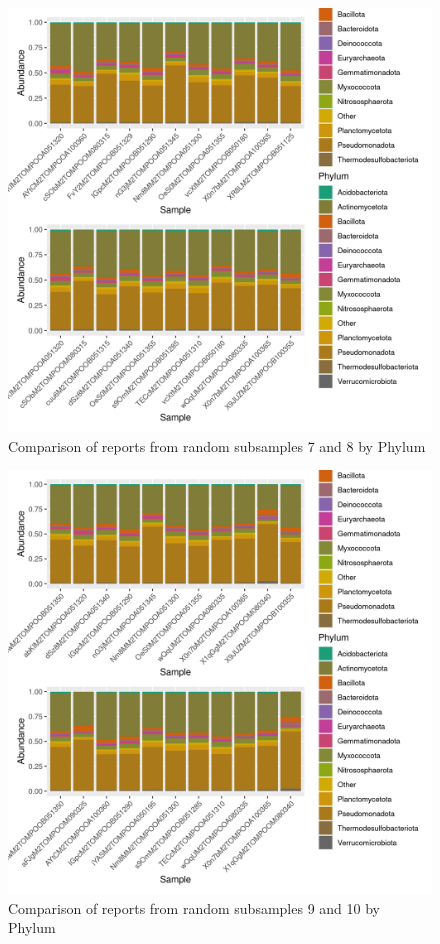 \documentclass{article}
\begin{document}
\begin{figure}
\centering
\includegraphics[scale=0.8]{tomate_aleatorio1_7.csv_tomate_aleatorio1_8.csv_relative_abundance_Phylum.png}
\caption{Comparison of reports from random subsamples 7 and 8 by Phylum}
\end{figure}


\begin{figure}
\centering
\includegraphics[scale=0.8]{tomate_aleatorio1_9.csv_tomate_aleatorio1_10.csv_relative_abundance_Phylum.png}
\caption{Comparison of reports from random subsamples 9 and 10 by Phylum}
\end{figure}
\end{document}
